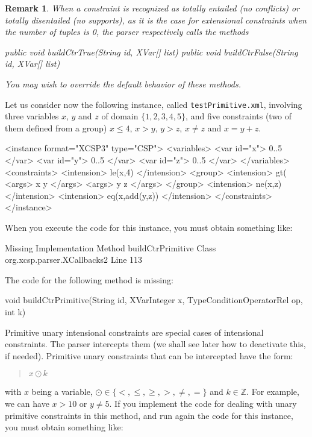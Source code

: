 \documentclass[10pt]{article}
\newenvironment{boxabsc}
               {\medskip \begin{bclogo}[barre=none,arrondi=0.2,logo=]{}\vspace{-0.6cm}}
               {\vspace{-0.1cm}\end{bclogo} \smallskip}
\newtheorem{remark}{Remark}
\newcommand{\nn}[1]{{\tt #1}} %
\begin{document}
\begin{remark}
When a constraint is recognized as totally entailed (no conflicts) or totally disentailed (no supports), as it is the case for extensional constraints when the number of tuples is 0, the parser respectively calls the methods 
\begin{absc}
  public void buildCtrTrue(String id, XVar[] list)
  public void buildCtrFalse(String id, XVar[] list) 
\end{absc} 
You may wish to override the default behavior of these methods.
\end{remark}

Let us consider now the following instance, called \nn{testPrimitive.xml}, involving three variables $x$, $y$ and $z$ of domain $\{1,2,3,4,5\}$, and five constraints (two of them defined from a group) $x\leq 4$, $x > y$, $y > z$, $x \neq z$ and $x = y+z$.

\begin{boxabsc}
\begin{absc}
<instance format="XCSP3" type="CSP">
  <variables>
    <var id="x"> 0..5 </var>
    <var id="y"> 0..5 </var>
    <var id="z"> 0..5 </var>
  </variables>
  <constraints>
    <intension> le(x,4) </intension>
    <group>
      <intension> gt(%
      <args> x y </args>
      <args> y z </args>
    </group>
    <intension> ne(x,z) </intension>
    <intension> eq(x,add(y,z)) </intension>
  </constraints>
</instance>
\end{absc} 
\end{boxabsc}


When you execute the code for this instance, you must obtain something like:

\begin{boxabsc}
\begin{absc}
Missing Implementation
  Method buildCtrPrimitive
  Class org.xcsp.parser.XCallbacks2
  Line 113
\end{absc} 
\end{boxabsc}

The code for the following method is missing:

\begin{boxabsc}
\begin{absc}
void buildCtrPrimitive(String id, XVarInteger x, TypeConditionOperatorRel op, int k) 
\end{absc} 
\end{boxabsc}

Primitive unary intensional constraints are special cases of intensional constraints.
The parser intercepts them (we shall see later how to deactivate this, if needed).
Primitive unary constraints that can be intercepted have the form:
\begin{quote}
$x \odot k$
\end{quote}
with $x$ being a variable, $\odot \in \{<,\leq,\geq,>,\neq,=\}$ and $k \in \mathbb{Z}$.
For example, we can have $x > 10$ or $y \neq 5$.
If you implement the code for dealing with unary primitive constraints in this method, and run again the code for this instance, you must obtain something like:
\end{document}
